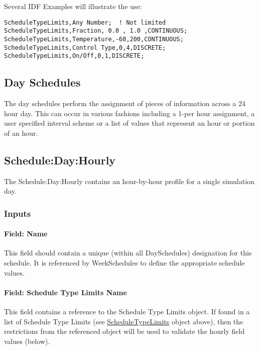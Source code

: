 Several IDF Examples will illustrate the use:

\begin{lstlisting}
ScheduleTypeLimits,Any Number;  ! Not limited
ScheduleTypeLimits,Fraction, 0.0 , 1.0 ,CONTINUOUS;
ScheduleTypeLimits,Temperature,-60,200,CONTINUOUS;
ScheduleTypeLimits,Control Type,0,4,DISCRETE;
ScheduleTypeLimits,On/Off,0,1,DISCRETE;
\end{lstlisting}

\subsection{Day Schedules}\label{day-schedules}

The day schedules perform the assignment of pieces of information across a 24 hour day. This can occur in various fashions including a 1-per hour assignment, a user specified interval scheme or a list of values that represent an hour or portion of an hour.

\subsection{Schedule:Day:Hourly}\label{scheduledayhourly}

The Schedule:Day:Hourly contains an hour-by-hour profile for a single simulation day.

\subsubsection{Inputs}\label{inputs-1-039}

\paragraph{Field: Name}\label{field-name-1-038}

This field should contain a unique (within all DaySchedules) designation for this schedule. It is referenced by WeekSchedules to define the appropriate schedule values.

\paragraph{Field: Schedule Type Limits Name}\label{field-schedule-type-limits-name-000}

This field contains a reference to the Schedule Type Limits object. If found in a list of Schedule Type Limits (see \hyperref[scheduletypelimits]{ScheduleTypeLimits} object above), then the restrictions from the referenced object will be used to validate the hourly field values (below).

